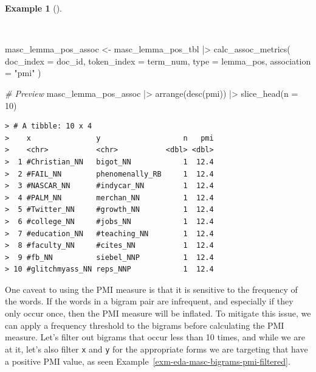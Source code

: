 \documentclass[
  letterpaper,
]{latex/krantz}
\newenvironment{Shaded}{\begin{snugshade}}{\end{snugshade}}
\newcommand{\AttributeTok}[1]{\textcolor[rgb]{0.00,0.00,0.00}{#1}}
\newcommand{\CommentTok}[1]{\textcolor[rgb]{0.00,0.00,0.00}{\textit{#1}}}
\newcommand{\DecValTok}[1]{\textcolor[rgb]{0.00,0.00,0.00}{#1}}
\newcommand{\FunctionTok}[1]{\textcolor[rgb]{0.00,0.00,0.00}{#1}}
\newcommand{\NormalTok}[1]{\textcolor[rgb]{0.00,0.00,0.00}{#1}}
\newcommand{\OtherTok}[1]{\textcolor[rgb]{0.00,0.00,0.00}{#1}}
\newcommand{\SpecialCharTok}[1]{\textcolor[rgb]{0.00,0.00,0.00}{#1}}
\newcommand{\StringTok}[1]{\textcolor[rgb]{0.00,0.00,0.00}{#1}}
\theoremstyle{definition}
\newtheorem{example}{Example}[chapter]
\theoremstyle{remark}
\begin{document}
\begin{example}[]\protect\hypertarget{exm-eda-masc-bigrams-pmi}{}\label{exm-eda-masc-bigrams-pmi}

~

\begin{Shaded}
\begin{Highlighting}[]
\NormalTok{masc\_lemma\_pos\_assoc }\OtherTok{\textless{}{-}}
\NormalTok{  masc\_lemma\_pos\_tbl }\SpecialCharTok{|\textgreater{}}
  \FunctionTok{calc\_assoc\_metrics}\NormalTok{(}
    \AttributeTok{doc\_index =}\NormalTok{ doc\_id,}
    \AttributeTok{token\_index =}\NormalTok{ term\_num,}
    \AttributeTok{type =}\NormalTok{ lemma\_pos,}
    \AttributeTok{association =} \StringTok{"pmi"}
\NormalTok{  )}

\CommentTok{\# Preview}
\NormalTok{masc\_lemma\_pos\_assoc }\SpecialCharTok{|\textgreater{}}
  \FunctionTok{arrange}\NormalTok{(}\FunctionTok{desc}\NormalTok{(pmi)) }\SpecialCharTok{|\textgreater{}}
  \FunctionTok{slice\_head}\NormalTok{(}\AttributeTok{n =} \DecValTok{10}\NormalTok{)}
\end{Highlighting}
\end{Shaded}

\begin{verbatim}
> # A tibble: 10 x 4
>    x               y                   n   pmi
>    <chr>           <chr>           <dbl> <dbl>
>  1 #Christian_NN   bigot_NN            1  12.4
>  2 #FAIL_NN        phenomenally_RB     1  12.4
>  3 #NASCAR_NN      #indycar_NN         1  12.4
>  4 #PALM_NN        merchan_NN          1  12.4
>  5 #Twitter_NN     #growth_NN          1  12.4
>  6 #college_NN     #jobs_NN            1  12.4
>  7 #education_NN   #teaching_NN        1  12.4
>  8 #faculty_NN     #cites_NN           1  12.4
>  9 #fb_NN          siebel_NNP          1  12.4
> 10 #glitchmyass_NN reps_NNP            1  12.4
\end{verbatim}

\end{example}

One caveat to using the PMI measure is that it is sensitive to the
frequency of the words. If the words in a bigram pair are infrequent,
and especially if they only occur once, then the PMI measure will be
inflated. To mitigate this issue, we can apply a frequency threshold to
the bigrams before calculating the PMI measure. Let's filter out bigrams
that occur less than 10 times, and while we are at it, let's also filter
\texttt{x} and \texttt{y} for the appropriate forms we are targeting
that have a positive PMI value, as seen
Example~\ref{exm-eda-masc-bigrams-pmi-filtered}.
\end{document}
